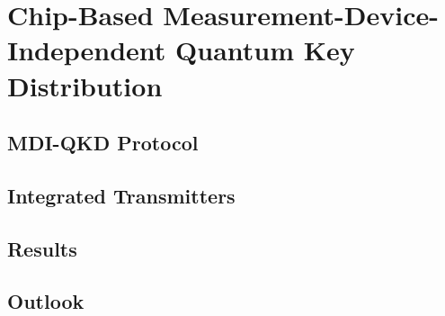 %
%
\let\textcircled=\pgftextcircled
\chapter{Chip-Based Measurement-Device-Independent Quantum Key Distribution}
\label{chap:mdiqkd}

\section{MDI-QKD Protocol}
\label{sec:mdi-qkd}

\section{Integrated Transmitters}

\section{Results}

\section{Outlook}


